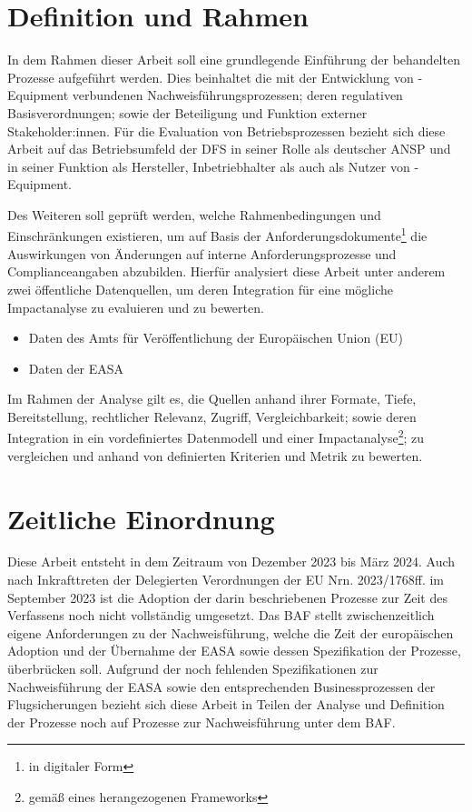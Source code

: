 \pagebreak
\section{Definition und Rahmen}

    In dem Rahmen dieser Arbeit soll eine grundlegende Einführung der behandelten Prozesse aufgeführt werden.
    Dies beinhaltet die mit der Entwicklung von \atmans{}-Equipment verbundenen Nachweisführungsprozessen; deren regulativen Basisverordnungen; sowie der Beteiligung und Funktion externer Stakeholder:innen.
    Für die Evaluation von Betriebsprozessen bezieht sich diese Arbeit auf das Betriebsumfeld der \ac{DFS} in seiner Rolle als deutscher \ac{ANSP} und in seiner Funktion als Hersteller, Inbetriebhalter als auch als Nutzer von \atmans-Equipment.

    \medskip
    Des Weiteren soll geprüft werden, welche Rahmenbedingungen und Einschränkungen existieren, um auf Basis der Anforderungsdokumente\footnote{in digitaler Form} die Auswirkungen von Änderungen auf interne Anforderungsprozesse und Complianceangaben abzubilden.
    Hierfür analysiert diese Arbeit unter anderem zwei öffentliche Datenquellen, um deren Integration für eine mögliche Impactanalyse zu evaluieren und zu bewerten.
    
    \begin{itemize}
        \item Daten des Amts für Veröffentlichung der Europäischen Union (\acs{EU})
        \item Daten der \ac{EASA}
    \end{itemize}

    \noindent
    Im Rahmen der Analyse gilt es, die Quellen anhand ihrer Formate, Tiefe, Bereitstellung, rechtlicher Relevanz, Zugriff, Vergleichbarkeit; sowie deren Integration in ein vordefiniertes Datenmodell und einer Impactanalyse\footnote{gemäß eines herangezogenen Frameworks}; zu vergleichen und anhand von definierten Kriterien und Metrik zu bewerten.

    
\section{Zeitliche Einordnung}

    Diese Arbeit entsteht in dem Zeitraum von Dezember 2023 bis März 2024.
    Auch nach Inkrafttreten der Delegierten Verordnungen der \ac{EU} Nrn. 2023/1768ff. im September 2023 ist die Adoption der darin beschriebenen Prozesse zur Zeit des Verfassens noch nicht vollständig umgesetzt. 
    Das \ac{BAF} stellt zwischenzeitlich eigene Anforderungen zu der Nachweisführung, welche die Zeit der europäischen Adoption und der Übernahme der \ac{EASA} sowie dessen Spezifikation der Prozesse, überbrücken soll.
    Aufgrund der noch fehlenden Spezifikationen zur Nachweisführung der \ac{EASA} sowie den entsprechenden Businessprozessen der Flugsicherungen bezieht sich diese Arbeit in Teilen der Analyse und Definition der Prozesse noch auf Prozesse zur Nachweisführung unter dem \ac{BAF}. 
